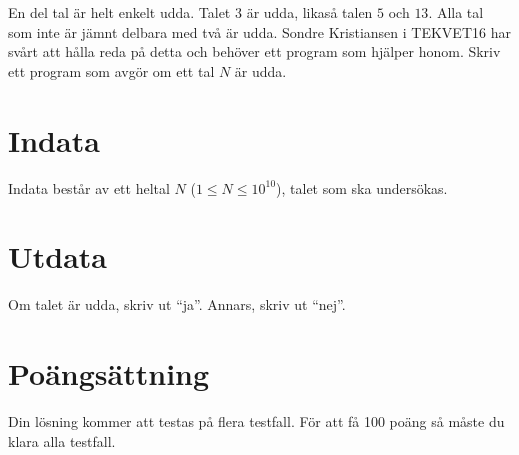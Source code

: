 En del tal är helt enkelt udda. Talet $3$ är udda, likaså talen $5$ och $13$. Alla
tal som inte är jämnt delbara med två är udda. Sondre Kristiansen i TEKVET16 har svårt
att hålla reda på detta och behöver ett program som hjälper honom. Skriv ett program
som avgör om ett tal $N$ är udda.

\section*{Indata}
Indata består av ett heltal $N$ ($1 \leq N \leq 10^{10}$), talet som ska undersökas.

\section*{Utdata}
Om talet är udda, skriv ut ``ja''. Annars, skriv ut ``nej''.

\section*{Poängsättning}
Din lösning kommer att testas på flera testfall. För att få 100 poäng så måste du klara alla testfall.
